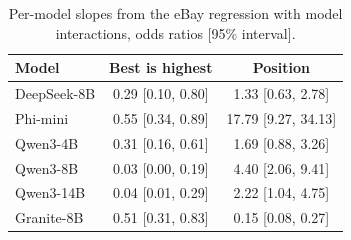\begin{table}[h!]
\caption{Per-model slopes from the eBay regression with model interactions, odds ratios [95\% interval].}
\label{tab:regmodel}
\small
\centering

\begin{tabular}{lcc}
\toprule
Model & Best is highest & Position \\
\midrule
DeepSeek-8B & 0.29 [0.10, 0.80] & 1.33 [0.63, 2.78] \\
Phi-mini & 0.55 [0.34, 0.89] & 17.79 [9.27, 34.13] \\
Qwen3-4B & 0.31 [0.16, 0.61] & 1.69 [0.88, 3.26] \\
Qwen3-8B & 0.03 [0.00, 0.19] & 4.40 [2.06, 9.41] \\
Qwen3-14B & 0.04 [0.01, 0.29] & 2.22 [1.04, 4.75] \\
Granite-8B & 0.51 [0.31, 0.83] & 0.15 [0.08, 0.27] \\
\bottomrule
\end{tabular}
\end{table}
